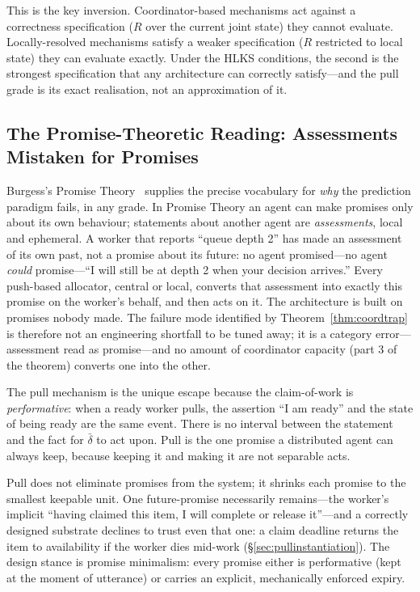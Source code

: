 \documentclass[11pt]{article}
\theoremstyle{definition}
\theoremstyle{plain}
\theoremstyle{plain}
\begin{document}
This is the key inversion. Coordinator-based mechanisms act against a correctness
specification ($R$ over the current joint state) they cannot evaluate. Locally-resolved
mechanisms satisfy a weaker specification ($R$ restricted to local state) they can
evaluate exactly. Under the HLKS conditions, the second is the strongest
specification that any architecture can correctly satisfy---and the pull
grade is its exact realisation, not an approximation of it.

\subsection{The Promise-Theoretic Reading: Assessments Mistaken for Promises}
\label{sec:promisereading}

Burgess's Promise Theory~\cite{burgess2018,burgess2013} supplies the precise
vocabulary for \emph{why} the prediction paradigm fails, in any grade. In
Promise Theory an agent can make promises only about its own behaviour;
statements about another agent are \emph{assessments}, local and ephemeral.
A worker that reports ``queue depth 2'' has made an assessment of its own
past, not a promise about its future: no agent promised---no agent
\emph{could} promise---``I will still be at depth 2 when your decision
arrives.'' Every push-based allocator, central or local, converts that
assessment into exactly this promise on the worker's behalf, and then acts
on it. The architecture is built on promises nobody made. The failure mode
identified by Theorem~\ref{thm:coordtrap} is therefore not an engineering
shortfall to be tuned away; it is a category error---assessment read as
promise---and no amount of coordinator capacity (part 3 of the theorem)
converts one into the other.

The pull mechanism is the unique escape because the claim-of-work is
\emph{performative}: when a ready worker pulls, the assertion ``I am ready''
and the state of being ready are the same event. There is no interval
between the statement and the fact for $\bar{\delta}$ to act upon. Pull is
the one promise a distributed agent can always keep, because keeping it and
making it are not separable acts.

Pull does not eliminate promises from the system; it shrinks each promise
to the smallest keepable unit. One future-promise necessarily remains---the
worker's implicit ``having claimed this item, I will complete or release
it''---and a correctly designed substrate declines to trust even that one:
a claim deadline returns the item to availability if the worker dies
mid-work (\S\ref{sec:pullinstantiation}). The design stance is promise
minimalism: every promise either is performative (kept at the moment of
utterance) or carries an explicit, mechanically enforced expiry.
\end{document}
